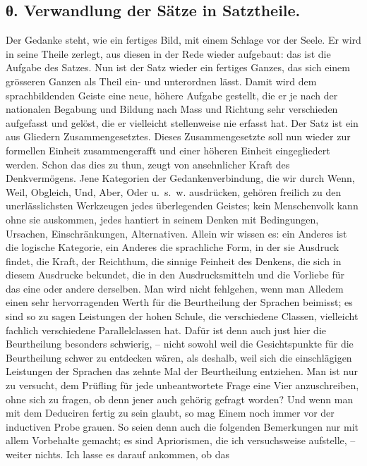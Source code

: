 \label{fp.444}

\subsection*{θ. Verwandlung der Sätze in Satztheile.}\label{IV.IV.Ictheta}

\largerpage[1]Der Gedanke steht, wie ein fertiges Bild, mit einem Schlage vor der Seele. Er wird in seine Theile zerlegt, aus diesen in der Rede wieder aufgebaut: das \label{sp.464} ist die Aufgabe des Satzes. Nun ist der Satz wieder ein fertiges Ganzes, das sich einem grösseren Ganzen als Theil ein- und unterordnen lässt. Damit wird dem sprachbildenden Geiste eine neue, höhere Aufgabe gestellt, die er je nach der nationalen Begabung und Bildung nach Mass und Richtung sehr verschieden aufgefasst und gelöst, die er vielleicht stellenweise nie erfasst hat. Der Satz ist ein aus Gliedern Zusammengesetztes. Dieses Zusammengesetzte soll nun wieder zur formellen Einheit zusammengerafft und einer höheren Einheit eingegliedert werden. Schon das  dies zu thun, zeugt von ansehnlicher Kraft des Denkvermögens. Jene Kategorien der Gedankenverbindung, die wir durch Wenn, Weil, Obgleich, Und, Aber, Oder u.~s.~w. ausdrücken, gehören freilich zu den unerlässlichsten Werkzeugen jedes überlegenden Geistes; kein Menschenvolk kann ohne sie auskommen, jedes hantiert in seinem Denken mit Bedingungen, Ursachen, Einschränkungen, Alternativen. Allein wir wissen es: ein Anderes ist die logische Kategorie, ein Anderes die sprachliche Form, in der sie Ausdruck findet, die Kraft, der Reichthum, die sinnige Feinheit des Denkens, die sich in diesem Ausdrucke bekundet, die  in den Ausdrucksmitteln und die Vorliebe für das eine oder andere derselben.  Man wird nicht fehlgehen, wenn man Alledem einen sehr hervorragenden Werth für die Beurtheilung der Sprachen beimisst; es sind so zu sagen Leistungen der hohen Schule, die verschiedene Classen, vielleicht fachlich verschiedene Parallelclassen hat. Dafür ist denn auch just hier die Beurtheilung besonders schwierig, – nicht sowohl weil die Gesichtspunkte für die Beurtheilung schwer zu entdecken wären, als deshalb, weil sich die einschlägigen Leistungen der Sprachen das zehnte Mal der Beurtheilung entziehen. Man ist nur zu versucht, dem Prüfling für jede unbeantwortete Frage eine Vier anzuschreiben, ohne sich zu fragen, ob denn jener auch gehörig gefragt worden? Und wenn man mit dem Deduciren fertig zu sein glaubt, so mag Einem noch immer vor der inductiven Probe grauen. So seien denn auch die folgenden Bemerkungen nur mit allem Vorbehalte gemacht; es sind Apriorismen, die ich versuchsweise aufstelle, – weiter nichts. Ich lasse es darauf \label{fp.445} ankommen, ob das 